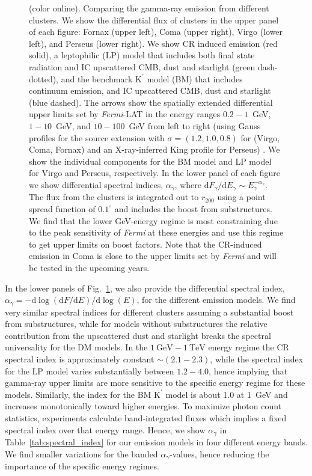 \documentclass[10pt,aps,pra,reprint,amsmath,amsfonts,amssymb,showpacs,nofootinbib,floatfix]{revtex4-1}
\newcommand{\Fermi}{{\em Fermi}\xspace}
\newcommand{\rmn}{\mathrm}
\newcommand{\Kp}{\rmn{K}^\prime}
\newcommand{\degs}{^\circ}
\newcommand{\colo}{(color online). }
\newcommand{\gev}{\rmn{GeV}}
\newcommand{\tev}{\rmn{TeV}}
\newcommand{\dd}{\rmn{d}}
\newcommand{\rvir}{r_{200}}
\begin{document}
\begin{figure}
\begin{minipage}{2.0\columnwidth}
\caption{\colo Comparing the gamma-ray emission from
  different clusters. We show the differential flux of clusters in the
  upper panel of each figure: Fornax (upper left), Coma (upper right),
  Virgo (lower left), and Perseus (lower right). We show CR induced
  emission (red solid), a leptophilic (LP) model that includes both
  final state radiation and IC upscattered CMB, dust and starlight
  (green dash-dotted), and the benchmark $\Kp$ model (BM) that
  includes continuum emission, and IC upscattered CMB, dust and
  starlight (blue dashed). The arrows show the spatially extended
  differential upper limits set by \Fermi-LAT in the energy ranges
  $0.2-1$~GeV, $1-10$~GeV, and $10-100$~GeV from left to right (using
  Gauss profiles for the source extension with $\sigma=(1.2,1.0,0.8)$
  for (Virgo, Coma, Fornax) and an X-ray-inferred King profile for
  Perseus) \cite{2010ApJ...717L..71A}. We show the individual
  components for the BM model and LP model for Virgo and Perseus,
  respectively. In the lower panel of each figure we show differential
  spectral indices, $\alpha_\gamma$, where $\dd F_\gamma/\dd E_\gamma
  \sim E_\gamma^{-\alpha_\gamma}$. The flux from the clusters is
  integrated out to $\rvir$ using a point spread function of $0.1\degs$
  and includes the boost from substructures. We find that the lower
  GeV-energy regime is most constraining due to the peak sensitivity
  of \Fermi at these energies and use this regime to get upper limits
  on boost factors. Note that the CR-induced emission in Coma is close
  to the upper limits set by \Fermi and will be tested in the upcoming
  years.}
 \label{fig:clu_comp}
\end{minipage}
\end{figure}

In the lower panels of Fig.~\ref{fig:clu_comp}, we also provide the
differential spectral index, $\alpha_\gamma=-\dd \log(\dd F/\dd E)/\dd
\log(E)$, for the different emission models. We find very similar
spectral indices for different clusters assuming a substantial boost
from substructures, while for models without substructures the
relative contribution from the upscattered dust and starlight breaks
the spectral universality for the DM models. In the $1~\gev-1~\tev$
energy regime the CR spectral index is approximately constant $\sim
(2.1-2.3)$, while the spectral index for the LP model varies
substantially between $1.2-4.0$, hence implying that gamma-ray upper
limits are more sensitive to the specific energy regime for these
models. Similarly, the index for the BM $\Kp$ model is about 1.0 at
1~GeV and increases monotonically toward higher energies. To maximize
photon count statistics, experiments calculate band-integrated fluxes
which implies a fixed spectral index over that energy range. Hence, we
show $\alpha_\gamma$ in Table~\ref{tab:spectral_index} for our
emission models in four different energy bands. We find smaller
variations for the banded $\alpha_\gamma$-values, hence reducing the
importance of the specific energy regimes.
\end{document}

